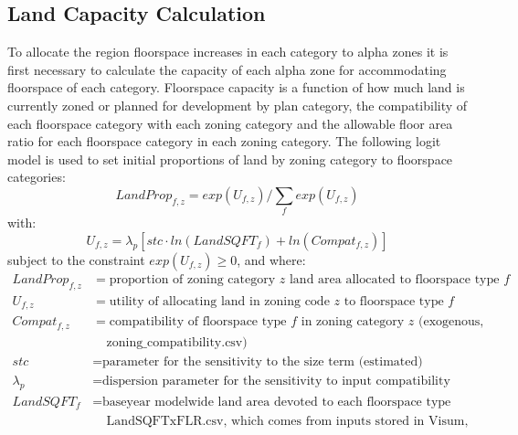 \subsection{Land Capacity Calculation}\label{sec:ald-step4}   %
To allocate the region floorspace increases in each category to alpha zones it is first necessary to calculate the capacity of each alpha zone for accommodating floorspace of each category. Floorspace capacity is a function of how much land is currently zoned or planned for development by plan category, the compatibility of each floorspace category with each zoning category and the allowable floor area ratio for each floorspace category in each zoning category. The following logit model is used to set initial proportions of land by zoning category to floorspace categories:
\begin{equation}\label{eq:5.14}   %
LandProp_{f,z} = exp(U_{f,z}) / \sum_f exp(U_{f,z})
\end{equation}
\noindent with:
\begin{equation}\label{eq:5.15}   %
U_{f,z} = \lambda_p \left[ stc \cdot ln(LandSQFT_f) + ln(Compat_{f,z}) \right]
\end{equation}
\noindent subject to the constraint $exp(U_{f,z}) \ge 0$, and where:
\begin{align*}
LandProp_{f,z} &= \text{proportion of zoning category $z$ land area allocated to floorspace type $f$} \\
U_{f,z} &= \text{utility of allocating land in zoning code $z$ to floorspace type $f$} \\
Compat_{f,z} &= \text{compatibility of floorspace type $f$ in zoning category $z$ (exogenous,} \\
 &~~~~~\text{zoning\_compatibility.csv)} \\
stc &= \text{parameter for the sensitivity to the size term (estimated)} \\
\lambda_{p} &= \text{dispersion parameter for the sensitivity to input compatibility matrix (estimated)} \\
LandSQFT_f &= \text{baseyear modelwide land area devoted to each floorspace type (exogenous,} \\
 &~~~~~\text{LandSQFTxFLR.csv, which comes from inputs stored in Visum, SI)}
\end{align*}

